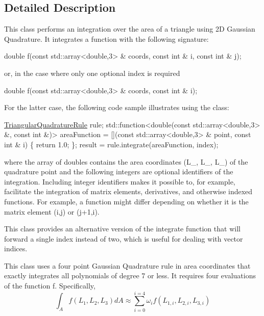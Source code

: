 \subsection{Detailed Description}
This class performs an integration over the area of a triangle using 2D Gaussian Quadrature. It integrates a function with the following signature\+: 
\begin{DoxyCode}
\textcolor{keywordtype}{double} f(\textcolor{keyword}{const} std::array<double,3> & coords, \textcolor{keyword}{const} \textcolor{keywordtype}{int} & i, \textcolor{keyword}{const} \textcolor{keywordtype}{int} & j);
\end{DoxyCode}
 or, in the case where only one optional index is required 
\begin{DoxyCode}
\textcolor{keywordtype}{double} f(\textcolor{keyword}{const} std::array<double,3> & coords, \textcolor{keyword}{const} \textcolor{keywordtype}{int} & i);
\end{DoxyCode}
 For the latter case, the following code sample illustrates using the class\+: 
\begin{DoxyCode}
\hyperlink{a00856_a70e3559ed9cc07f46b1bc682c80e9dcb}{TriangularQuadratureRule} rule;
std::function<double(const std::array<double,3> &,
   \textcolor{keyword}{const} \textcolor{keywordtype}{int} &)> areaFunction = [](\textcolor{keyword}{const} std::array<double,3> & point,
   \textcolor{keyword}{const} \textcolor{keywordtype}{int} & i) \{
   \textcolor{keywordflow}{return} 1.0;
\};
result = rule.integrate(areaFunction, index);
\end{DoxyCode}
 where the array of doubles contains the area coordinates (L\+\_, L\+\_, L\+\_) of the quadrature point and the following integers are optional identifiers of the integration. Including integer identifiers makes it possible to, for example, facilitate the integration of matrix elements, derivatives, and otherwise indexed functions. For example, a function might differ depending on whether it is the matrix element (i,j) or (j+1,i).

This class provides an alternative version of the integrate function that will forward a single index instead of two, which is useful for dealing with vector indices.

This class uses a four point Gaussian Quadrature rule in area coordinates that exactly integrates all polynomials of degree 7 or less. It requires four evaluations of the function f. Specifically, \[ \int_{A} f(L_{1},L_{2},L_{3}) dA \approx \sum_{i=0}^{i=4} \omega_{i}f(L_{1,i},L_{2,i},L_{3,i}) \]

